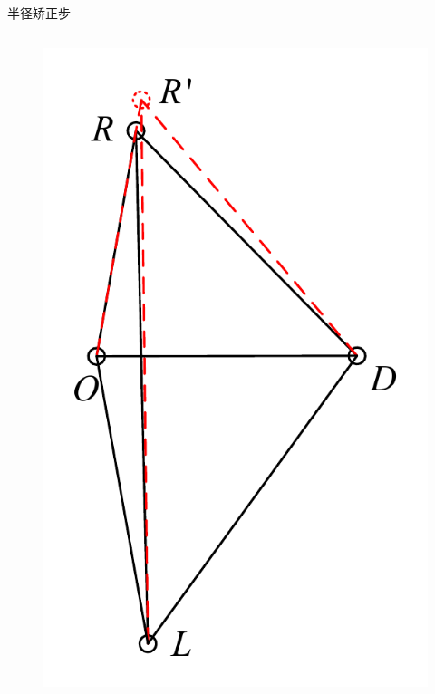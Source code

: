 \documentclass[aspectratio=169]{beamer}
\begin{document}
\begin{frame}{半径矫正步}
    \begin{columns}
        \begin{figure}[!ht]
            \centering
            \includegraphics[width=\textwidth]{图片/半径矫正步1.pdf}
        \end{figure}


\end{columns}
\end{frame}
\end{document}
